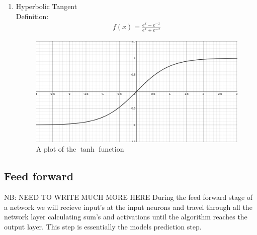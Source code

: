 \documentclass{article}
\begin{document}
\begin{enumerate}
\begin{figure}[H]
\end{figure}
\item Hyperbolic Tangent\\
Definition:
\begin{align*}
f(x) = \frac{e^x - e^{-x}}{e^x + e^{-x}}
\end{align*}
\begin{figure}[H]
\centering
\caption{A plot of the $\tanh$ function}
\includegraphics[scale=0.2]{tanh.png}
\end{figure}
\end{enumerate}

\label{sec:activationfuncs}

\subsection{Feed forward}
\label{sec:forward}
NB: NEED TO WRITE MUCH MORE HERE
During the feed forward stage of a network we will recieve input's at the input neurons and travel through all the network layer calculating sum's and activations until the algorithm reaches the output layer. This step is essentially the models prediction step.
\end{document}
